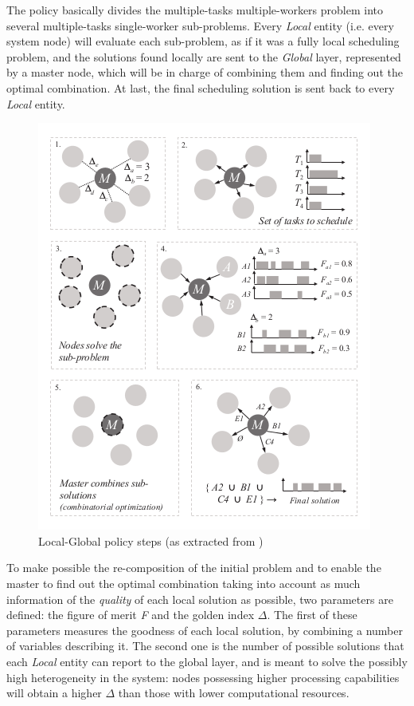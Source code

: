 The policy basically divides the multiple-tasks multiple-workers problem into several multiple-tasks single-worker sub-problems. Every \emph{Local} entity (i.e. every system node) will evaluate each sub-problem, as if it was a fully local scheduling problem, and the solutions found locally are sent to the \emph{Global} layer, represented by a master node, which will be in charge of combining them and finding out the optimal combination. At last, the final scheduling solution is sent back to every \emph{Local} entity.

\begin{figure}[h!]
\centering
\includegraphics[scale=0.5]{Figures/LGsteps.png} 
\caption{Local-Global policy steps (as extracted from \cite{Araguz15})}
\label{LGsteps}
\end{figure}

To make possible the re-composition of the initial problem and to enable the master to find out the optimal combination taking into account as much information of the \emph{quality} of each local solution as possible, two parameters are defined: the figure of merit \emph{F} and the golden index $ \Delta $. The first of these parameters measures the goodness of each local solution, by combining a number of variables describing it. The second one is the number of possible solutions that each \emph{Local} entity can report to the global layer, and is meant to solve the possibly high heterogeneity in the system: nodes possessing higher processing capabilities will obtain a higher $ \Delta $ than those with lower computational resources.

